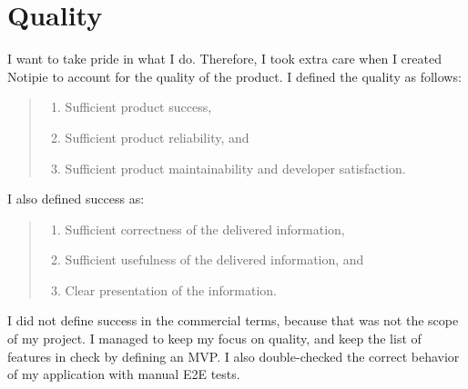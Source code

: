 \section{Quality}\label{sec:quality}

I want to take pride in what I do.
Therefore,
I took extra care when I created Notipie
to account for the quality of the product.
I defined the quality as follows:

\begin{quote}
  \begin{enumerate}
    \item Sufficient product success,
    \item Sufficient product reliability, and
    \item Sufficient product maintainability and developer satisfaction.
  \end{enumerate}
\end{quote}

I also defined success as:

\begin{quote}
  \begin{enumerate}
    \item Sufficient correctness of the delivered information,
    \item Sufficient usefulness of the delivered information, and
    \item Clear presentation of the information.
  \end{enumerate}
\end{quote}

I did not define success in the commercial terms,
because that was not the scope of my project.
I managed to keep my focus on quality,
and keep the list of features in check
by defining an \ac{MVP}.
I also double-checked the correct behavior
of my application with manual \ac{E2E} tests.




